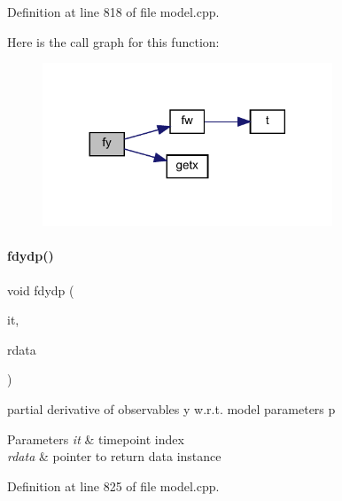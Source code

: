 Definition at line 818 of file model.\+cpp.

Here is the call graph for this function\+:
\nopagebreak
\begin{figure}[H]
\begin{center}
\leavevmode
\includegraphics[width=245pt]{classamici_1_1_model_acd37693bbc14eead48d9a40c72f42a89_cgraph}
\end{center}
\end{figure}
\mbox{\label{classamici_1_1_model_a884ccb083130cb1af7ebe93f7a6d361a}} 
\paragraph{\texorpdfstring{fdydp()}{fdydp()}\hspace{0.1cm}{\footnotesize\ttfamily [1/2]}}
{\footnotesize\ttfamily void fdydp (\begin{DoxyParamCaption}\item[{const int}]{it,  }\item[{\mbox{\hyperlink{classamici_1_1_return_data}{Return\+Data}} $\ast$}]{rdata }\end{DoxyParamCaption})}

partial derivative of observables y w.\+r.\+t. model parameters p 
\begin{DoxyParams}{Parameters}
{\em it} & timepoint index \\
\hline
{\em rdata} & pointer to return data instance \\
\hline
\end{DoxyParams}


Definition at line 825 of file model.\+cpp.

